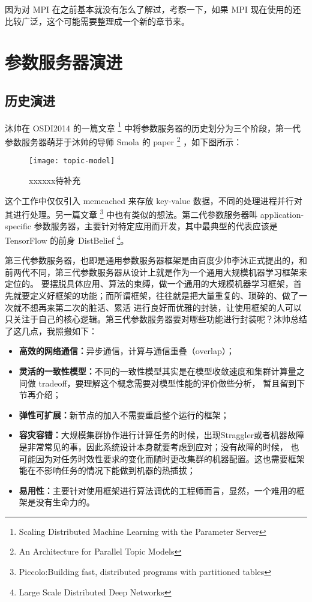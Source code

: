 \begin{newnote}[MPI]
因为对 MPI 在之前基本就没有怎么了解过，考察一下，如果 MPI 现在使用的还比较广泛，这个可能需要整理成一个新的章节来。 %
\end{newnote}


\section{参数服务器演进}\label{subsec:ps-revolution}

\subsection{历史演进}\label{subsec:ps-history}

沐帅在 OSDI2014 的一篇文章%
\footnote{Scaling Distributed Machine Learning with the Parameter Server}%
中将参数服务器的历史划分为三个阶段，第一代参数服务器萌芽于沐帅的导师 Smola 的 paper%
\footnote{An Architecture for Parallel Topic Models}%
，如下图所示：

\begin{figure}[hbtp]
\centering
\texttt{[image: topic-model]}
\caption{xxxxxx待补充}
\end{figure}

这个工作中仅仅引入 memcached 来存放 key-value 数据，不同的处理进程并行对其进行处理。另一篇文章%
\footnote{Piccolo:Building fast, distributed programs with partitioned tables}%
中也有类似的想法。第二代参数服务器叫 application-specific 参数服务器，主要针对特定应用而开发，其中最典型的代表应该是 TensorFlow 的前身 DistBelief%
\footnote{Large Scale Distributed Deep Networks}。

第三代参数服务器，也即是通用参数服务器框架是由百度少帅李沐正式提出的，和前两代不同，第三代参数服务器从设计上就是作为一个通用大规模机器学习框架来定位的。
要摆脱具体应用、算法的束缚，做一个通用的大规模机器学习框架，首先就要定义好框架的功能；而所谓框架，往往就是把大量重复的、琐碎的、做了一次就不想再来第二次的脏活、累活
进行良好而优雅的封装，让使用框架的人可以只关注于自己的核心逻辑。第三代参数服务器要对哪些功能进行封装呢？沐帅总结了这几点，我照搬如下：

\begin{itemize}
  \item \textbf{高效的网络通信：}异步通信，计算与通信重叠（overlap）；
  \item \textbf{灵活的一致性模型：}不同的一致性模型其实是在模型收敛速度和集群计算量之间做 tradeoff，要理解这个概念需要对模型性能的评价做些分析，
  暂且留到下节再介绍；
  \item \textbf{弹性可扩展：}新节点的加入不需要重启整个运行的框架；
  \item \textbf{容灾容错：}大规模集群协作进行计算任务的时候，出现Straggler或者机器故障是非常常见的事，因此系统设计本身就要考虑到应对；没有故障的时候，
  也可能因为对任务时效性要求的变化而随时更改集群的机器配置。这也需要框架能在不影响任务的情况下能做到机器的热插拔；
  \item \textbf{易用性：}主要针对使用框架进行算法调优的工程师而言，显然，一个难用的框架是没有生命力的。
\end{itemize}

